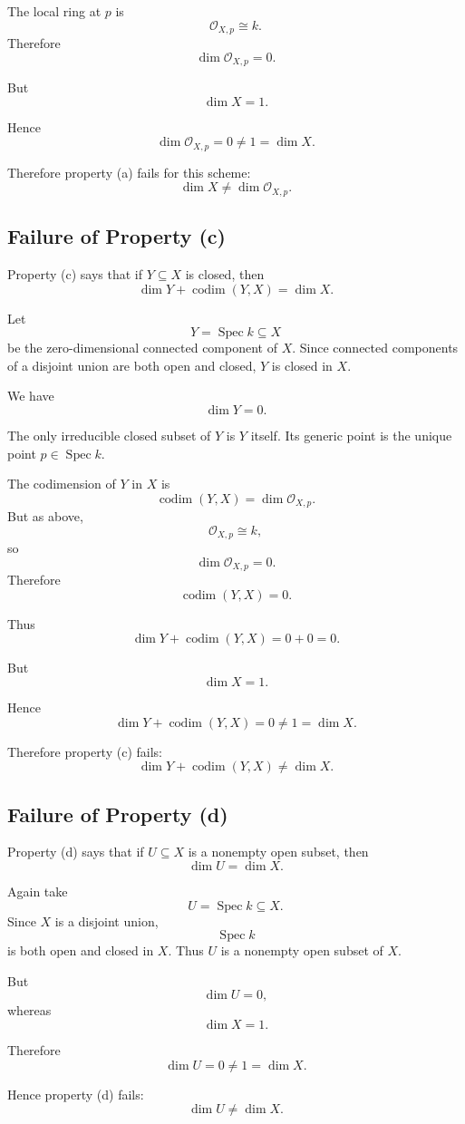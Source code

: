 \documentclass[12pt,a4paper]{article}
\DeclareMathOperator{\Spec}{Spec}
\newcommand{\codim}{\operatorname{codim}}
\providecommand{\Spec}{\operatorname{Spec}}
\theoremstyle{notespace}
\begin{document}
The local ring at \(p\) is
\[
\mathcal O_{X,p}\cong k.
\]
Therefore
\[
\dim \mathcal O_{X,p}=0.
\]

But
\[
\dim X=1.
\]

Hence
\[
\dim \mathcal O_{X,p}=0\neq 1=\dim X.
\]

Therefore property (a) fails for this scheme:
\[
\boxed{\dim X\neq \dim \mathcal O_{X,p}.}
\]

\subsection{Failure of Property (c)}

Property (c) says that if \(Y\subseteq X\) is closed, then
\[
\dim Y+\codim(Y,X)=\dim X.
\]

Let
\[
Y=\Spec k\subseteq X
\]
be the zero-dimensional connected component of \(X\). Since connected components of a disjoint union are both open and closed, \(Y\) is closed in \(X\).

We have
\[
\dim Y=0.
\]

The only irreducible closed subset of \(Y\) is \(Y\) itself. Its generic point is the unique point \(p\in \Spec k\).

The codimension of \(Y\) in \(X\) is
\[
\codim(Y,X)=\dim \mathcal O_{X,p}.
\]
But as above,
\[
\mathcal O_{X,p}\cong k,
\]
so
\[
\dim \mathcal O_{X,p}=0.
\]
Therefore
\[
\codim(Y,X)=0.
\]

Thus
\[
\dim Y+\codim(Y,X)=0+0=0.
\]

But
\[
\dim X=1.
\]

Hence
\[
\dim Y+\codim(Y,X)=0\neq 1=\dim X.
\]

Therefore property (c) fails:
\[
\boxed{\dim Y+\codim(Y,X)\neq \dim X.}
\]

\subsection{Failure of Property (d)}

Property (d) says that if \(U\subseteq X\) is a nonempty open subset, then
\[
\dim U=\dim X.
\]

Again take
\[
U=\Spec k\subseteq X.
\]
Since \(X\) is a disjoint union,
\[
\Spec k
\]
is both open and closed in \(X\). Thus \(U\) is a nonempty open subset of \(X\).

But
\[
\dim U=0,
\]
whereas
\[
\dim X=1.
\]

Therefore
\[
\dim U=0\neq 1=\dim X.
\]

Hence property (d) fails:
\[
\boxed{\dim U\neq \dim X.}
\]
\end{document}
